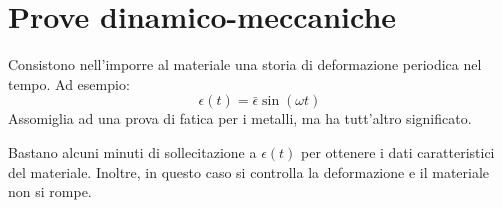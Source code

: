 \chapter{Prove dinamico-meccaniche}\label{chp:DinamicoMeccaniche}
Consistono nell'imporre al materiale una storia di deformazione periodica nel tempo.
Ad esempio:
\begin{equation}
\epsilon(t) = \bar{\epsilon}\sin(\omega t)
\end{equation}
Assomiglia ad una prova di fatica per i metalli, ma ha tutt'altro significato.

Bastano alcuni minuti di sollecitazione a $\epsilon(t)$ per ottenere i dati caratteristici del materiale. Inoltre, in questo caso si controlla la deformazione e il materiale non si rompe.


